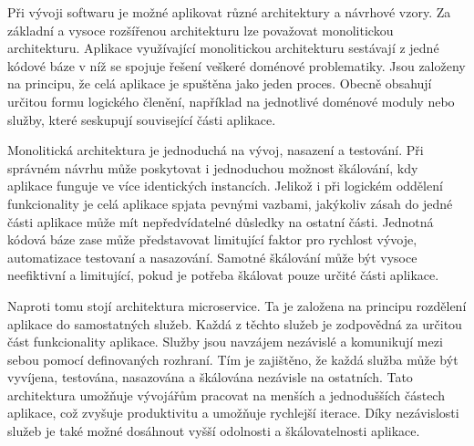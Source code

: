 

Při vývoji softwaru je možné aplikovat různé architektury a návrhové vzory. Za základní a vysoce rozšířenou architekturu lze považovat monolitickou architekturu. Aplikace využívající monolitickou architekturu sestávají z jedné kódové báze v níž se spojuje řešení veškeré doménové problematiky. \cite{Williams2023}  Jsou založeny na principu, že celá aplikace je spuštěna jako jeden proces. Obecně obsahují určitou formu logického členění, například na jednotlivé doménové moduly nebo služby, které seskupují související části aplikace. \cite{Williams2023} 


Monolitická architektura je jednoduchá na vývoj, nasazení a testování. Při správném návrhu může poskytovat i jednoduchou možnost škálování, kdy aplikace funguje ve více identických instancích. \cite{Richardson2018} Jelikož i při logickém oddělení funkcionality je celá aplikace spjata pevnými vazbami, jakýkoliv zásah do jedné části aplikace může mít nepředvídatelné důsledky na ostatní části. Jednotná kódová báze zase může představovat limitující faktor pro rychlost vývoje, automatizace testovaní a nasazování. Samotné škálování může být vysoce neefiktivní a limitující, pokud je potřeba škálovat pouze určité části aplikace. \cite{Richardson2018}

Naproti tomu stojí architektura microservice. Ta je založena na principu rozdělení aplikace do samostatných služeb. Každá z těchto služeb je zodpovědná za určitou část funkcionality aplikace. Služby jsou navzájem nezávislé a komunikují mezi sebou pomocí definovaných rozhraní. \cite{Richardson2018} Tím je zajištěno, že každá služba může být vyvíjena, testována, nasazována a škálována nezávisle na ostatních. Tato architektura umožňuje vývojářům pracovat na menších a jednodušších částech aplikace, což zvyšuje produktivitu a umožňuje rychlejší iterace. Díky nezávislosti služeb je také možné dosáhnout vyšší odolnosti a škálovatelnosti aplikace. 


